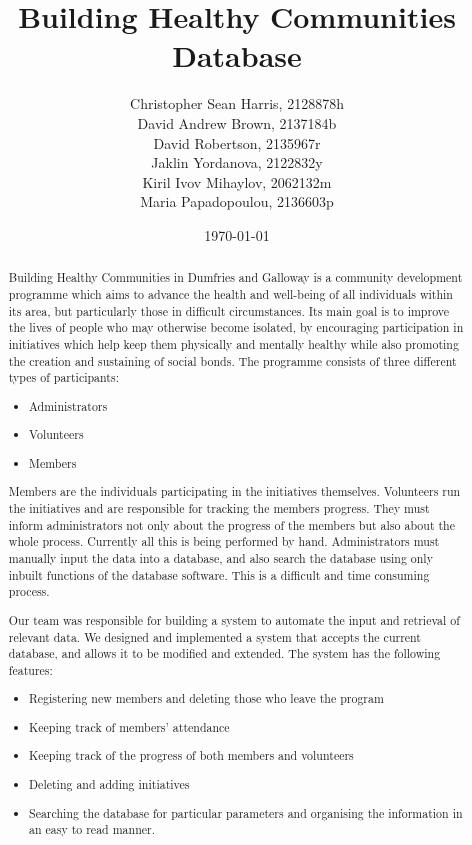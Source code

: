 \documentclass{l3proj}
\begin{document}
\title{Building Healthy Communities Database}

\author{
Christopher Sean Harris, 2128878h \\
David Andrew Brown, 2137184b \\
David Robertson, 2135967r \\
Jaklin Yordanova, 2122832y \\
Kiril Ivov Mihaylov, 2062132m \\
Maria Papadopoulou, 2136603p}

\date{\today}

\maketitle

\begin{abstract}

Building Healthy Communities in Dumfries and Galloway is a community development programme which aims to advance the health and well-being of all individuals within its area, but particularly those in difficult circumstances. Its main goal is to improve the lives of people who may otherwise become isolated, by encouraging participation in initiatives which help keep them physically and mentally healthy while also promoting the creation and sustaining of social bonds. The programme consists of three different types of participants:
\begin{itemize}
	\item Administrators
	\item Volunteers
	\item Members
\end{itemize}
Members are the individuals participating in the initiatives themselves. Volunteers run the initiatives and are responsible for tracking the members progress. They must inform administrators not only about the progress of the members but also about the whole process. Currently all this is being performed by hand. Administrators must manually input the data into a database, and also search the database using only inbuilt functions of the database software. This is a difficult and time consuming process.

Our team was responsible for building a system to automate the input and retrieval of relevant data. We designed and implemented a system that accepts the current database, and allows it to be modified and extended. The system has the following features:
\begin{itemize}
	\item Registering new members and deleting those who leave the program
	\item Keeping track of members' attendance
	\item Keeping track of the progress of both members and volunteers
	\item Deleting and adding initiatives
	\item Searching the database for particular parameters and organising the information in an easy to read manner.
\end{itemize}

\end{abstract}
\end{document}
